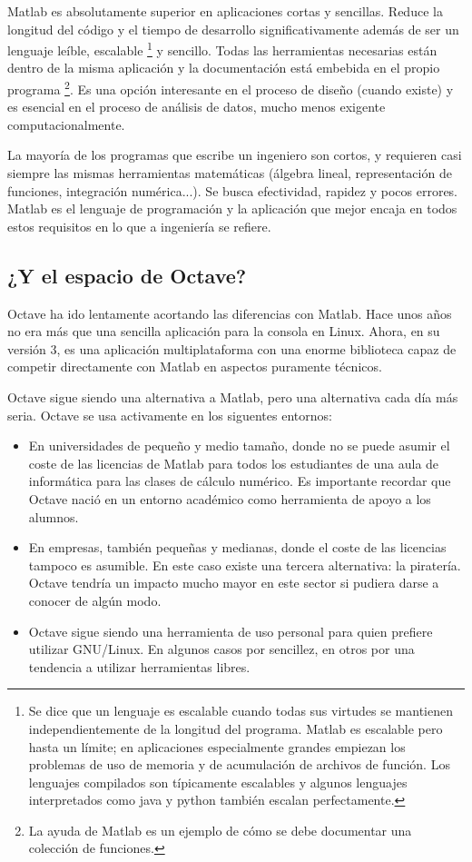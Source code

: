 Matlab es absolutamente superior en aplicaciones cortas y sencillas.
Reduce la longitud del código y el tiempo de desarrollo
significativamente además de ser un lenguaje leíble, escalable%
\footnote{Se dice que un lenguaje es escalable cuando todas sus
  virtudes se mantienen independientemente de la longitud del
  programa. Matlab es escalable pero hasta un límite; en aplicaciones
  especialmente grandes empiezan los problemas de uso de memoria y de
  acumulación de archivos de función. Los lenguajes compilados son
  típicamente escalables y algunos lenguajes interpretados como java y
  python también escalan perfectamente.%
} y sencillo. Todas las herramientas necesarias están dentro de la
misma aplicación y la documentación está embebida en el propio
programa%
\footnote{La ayuda de Matlab es un ejemplo de cómo se debe documentar
  una colección de funciones.%
}. Es una opción interesante en el proceso de diseño (cuando existe) y
es esencial en el proceso de análisis de datos, mucho menos exigente
computacionalmente.

La mayoría de los programas que escribe un ingeniero son cortos, y
requieren casi siempre las mismas herramientas matemáticas (álgebra
lineal, representación de funciones, integración numérica...). Se
busca efectividad, rapidez y pocos errores. Matlab es el lenguaje de
programación y la aplicación que mejor encaja en todos estos
requisitos en lo que a ingeniería se refiere.


\subsection{¿Y el espacio de Octave?}

Octave ha ido lentamente acortando las diferencias con Matlab. Hace
unos años no era más que una sencilla aplicación para la consola en
Linux.  Ahora, en su versión 3, es una aplicación multiplataforma con
una enorme biblioteca capaz de competir directamente con Matlab en
aspectos puramente técnicos.

Octave sigue siendo una alternativa a Matlab, pero una alternativa
cada día más seria.  Octave se usa activamente en los siguentes
entornos:

\begin{itemize}
\item En universidades de pequeño y medio tamaño, donde no se puede
  asumir el coste de las licencias de Matlab para todos los
  estudiantes de una aula de informática para las clases de cálculo
  numérico.  Es importante recordar que Octave nació en un entorno
  académico como herramienta de apoyo a los alumnos.
\item En empresas, también pequeñas y medianas, donde el coste de las
  licencias tampoco es asumible.  En este caso existe una tercera
  alternativa: la piratería. Octave tendría un impacto mucho mayor en
  este sector si pudiera darse a conocer de algún modo.
\item Octave sigue siendo una herramienta de uso personal para quien
  prefiere utilizar GNU/Linux.  En algunos casos por sencillez, en
  otros por una tendencia a utilizar herramientas libres.
\end{itemize}

